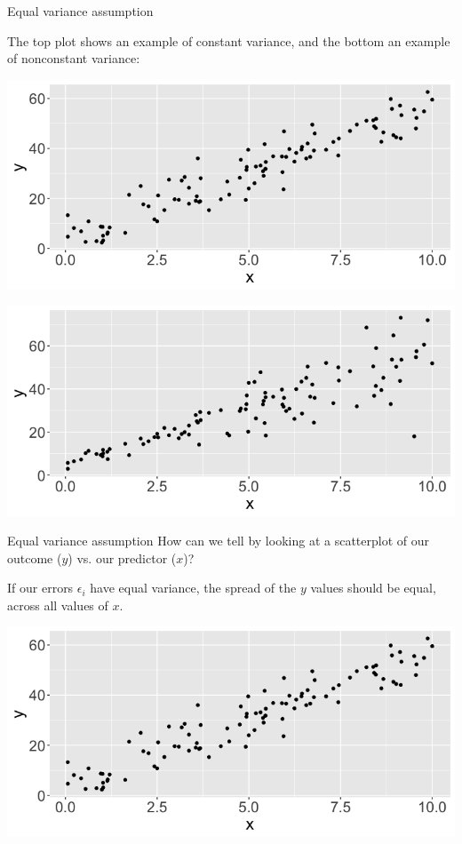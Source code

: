 \documentclass[10pt,t]{beamer}
\begin{document}
\begin{frame}{Equal variance assumption}

The top plot shows an example of constant variance, and the bottom an example of nonconstant variance:

\vspace{0.3cm}

\centering

\includegraphics[scale=0.2]{constvar.png}

\includegraphics[scale=0.2]{nonconstvar.png}

\end{frame}

\begin{frame}{Equal variance assumption}
How can we tell by looking at a scatterplot of our outcome ($y$) vs. our predictor ($x$)?

\vspace{0.3cm}

If our errors $\epsilon_i$ have equal variance, the spread of the $y$ values should be equal, across all values of $x$.

\vspace{0.3cm}
\centering

\includegraphics[scale=0.3]{constvar.png}

\end{frame}
\end{document}
